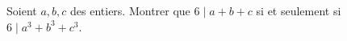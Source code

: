 Soient $a, b, c$ des entiers. Montrer que $6 \mid a + b + c$ si et seulement si $6 \mid a^3 + b^3 + c^3$.
